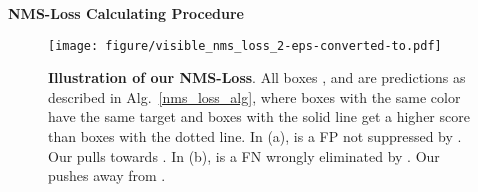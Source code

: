 \documentclass[sigconf]{acmart}
\begin{document}
\begin{algorithm}[t!]
\small
\SetAlgoLined
{}
 \caption{\textbf{NMS-Loss Calculating Procedure}}
 \label{nms_loss_alg}

\end{algorithm}

\begin{figure}[t!]
\centering
\texttt{[image: figure/visible\_nms\_loss\_2-eps-converted-to.pdf]}
\vspace{-3mm}
\caption{\textbf{Illustration of our NMS-Loss}. All boxes ,  and  are predictions as described in Alg.~\ref{nms_loss_alg}, where boxes with the same color have the same target and boxes with the solid line get a higher score than boxes with the dotted line. In (a),  is a FP not suppressed by . Our  pulls  towards . In (b),  is a FN wrongly eliminated by . Our  pushes  away from .}
\vspace{-3mm}
\label{visible_nms_loss}
\end{figure}
\end{document}
